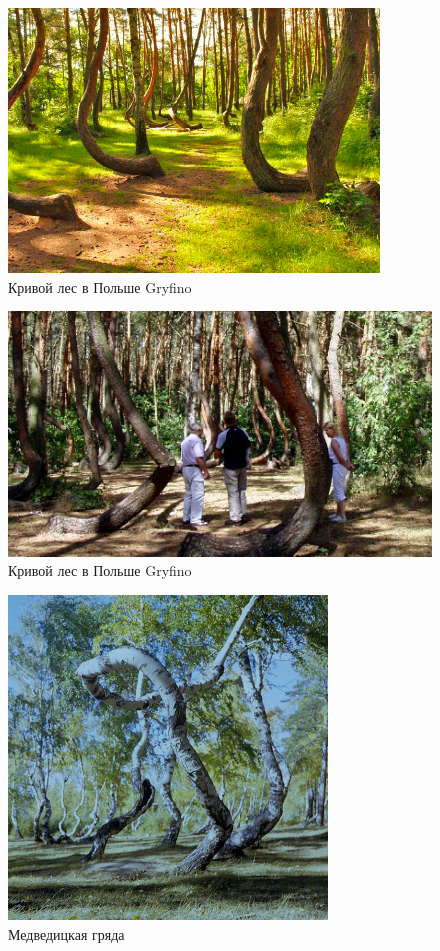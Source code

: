 \documentclass[11pt]{article}
\begin{document}
\begin{figure}[!htpb]
\centering
\includegraphics[scale=0.9]{gryfino_1}
\caption{Кривой лес в Польше Gryfino}
\label{}
\end{figure}

\begin{figure}[!htpb]
\centering
\includegraphics[scale=0.9]{gryfino_2}
\caption{Кривой лес в Польше Gryfino}
\label{}
\end{figure}

\begin{figure}[!htpb]
\centering
\includegraphics[scale=0.9]{medved}
\caption{Медведицкая гряда}
\label{}
\end{figure}
\end{document}

